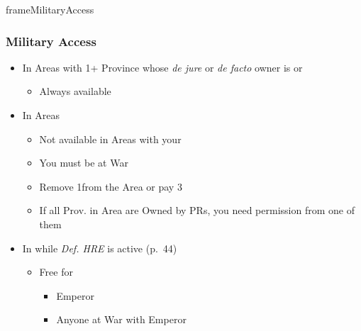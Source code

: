 \documentclass[10pt]{article}
\newlength{\fhMilitaryAccess} \setlength\fhMilitaryAccess{14\baselineskip}
\begin{document}
\framebreak

\begin{dynamiccontents*}{frameMilitaryAccess}\begin{eubox}{\fhMilitaryAccess}
	\subsubsection*{Military Access }
	\begin{itemize}
		\item In Areas with 1+ Province whose \emph{de jure} or \emph{de facto} owner is  or 
		\begin{itemize}
			\item Always available
		\end{itemize}
		\item In  Areas
		\begin{itemize}
			\item Not available in Areas with your \claims
			\item You must be at War
			\item Remove 1\influence from the Area or pay 3\ducats
			\item If all Prov. in Area are Owned by PRs, you need permission from one of them
		\end{itemize}
		\item In  while \emph{Def. HRE} is active (p.~44)
		\begin{itemize}
			\item Free for
			\begin{itemize}
				\item Emperor
				\item Anyone at War with Emperor
			\end{itemize}
		\end{itemize}
	\end{itemize}
\end{eubox}\end{dynamiccontents*}
\end{document}
